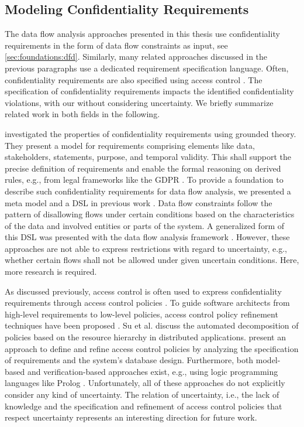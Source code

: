 \subsection{Modeling Confidentiality Requirements}

The data flow analysis approaches presented in this thesis use confidentiality requirements in the form of data flow constraints as input, see \autoref{sec:foundations:dfd}.
Similarly, many related approaches discussed in the previous paragraphs use a dedicated requirement specification language.
Often, confidentiality requirements are also specified using access control \cite{nguyen_extensive_2015}.
The specification of confidentiality requirements impacts the identified confidentiality violations, with our without considering uncertainty.
We briefly summarize related work in both fields in the following.

\textcite{onabajo_properties_2006} investigated the properties of confidentiality requirements using grounded theory.
They present a model for requirements comprising elements like data, stakeholders, statements, purpose, and temporal validity.
This shall support the precise definition of requirements and enable the formal reasoning on derived rules, e.g., from legal frameworks like the \acf{GDPR} \cite{council_of_european_union_regulation_2016}.
To provide a foundation to describe such confidentiality requirements for data flow analysis, we presented a meta model and a \ac{DSL} in previous work \cite{hahner_modeling_2021}.
Data flow constraints follow the pattern of disallowing flows under certain conditions based on the characteristics of the data and involved entities or parts of the system.
A generalized form of this \ac{DSL} was presented with the data flow analysis framework \cite{boltz_extensible_2024}.
However, these approaches are not able to express restrictions with regard to uncertainty, e.g., whether certain flows shall not be allowed under given uncertain conditions.
Here, more research is required.

As discussed previously, access control is often used to express confidentiality requirements through access control policies \cite{seifermann_architectural_2022}.
To guide software architects from high-level requirements to low-level policies, access control policy refinement techniques have been proposed \cite{yang_security_2013}.
Su et al. \cite{linying_su_automated_2005} discuss the automated decomposition of policies based on the resource hierarchy in distributed applications.
\textcite{he_requirements-based_2009} present an approach to define and refine access control policies by analyzing the specification of requirements and the system's database design.
Furthermore, both model-based \cite{massacci_model-driven_2008,maeder_modeling_2020} and verification-based \cite{mery_specication_2007,cheminod_comprehensive_2019} approaches exist, e.g., using logic programming languages like Prolog \cite{craven_policy_2011,zhao_policy_2011}.
Unfortunately, all of these approaches do not explicitly consider any kind of uncertainty.
The relation of uncertainty, i.e., the lack of knowledge and the specification and refinement of access control policies that respect uncertainty represents an interesting direction for future work.


